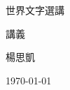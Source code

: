 \begin{titlepage}
  \thispagestyle{empty}
  \centering

  \vspace*{2.2cm}

  {\BookTitleFont\fontsize{56}{68}\selectfont 世界文字選講\par}

  \vspace{1.2cm}

  {\CJKsans\Large 講義\par}

  \vfill

  {\AuthorFont\Large 楊思凱\par}
  \vspace{0.4cm}
  {\CJKsans\normalsize \today\par}

  \vspace*{1.6cm}
\end{titlepage}
